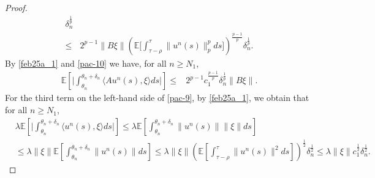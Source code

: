 \documentclass[11pt]{article}
\numberwithin{equation}{section}
\theoremstyle{plain}
\begin{document}
\begin{proof}
\begin{align}
                  \delta_n^{\frac{1}{p} }  \nonumber\\
     \le &2^{p-1} \|B\xi \| 
                  \left( \mathbb{E} 
                                  \bigg[ \int_{\tau - \rho}^{\tau} 
                                                 \|u^n(s)\|_p^p ds 
                                   \bigg] 
                  \right)^{\frac{p-1}{p} } 
                  \delta_n^{\frac{1}{p} }.                                                        
 \end{align}
 By \eqref{feb25a_1} and
 \eqref{pac-10} we have,
 for all $n\ge N_1$,
  \begin{align} \label{pac-12}
        \mathbb{E} 
                  \left[ \Big|
                               \int_{\theta_n}^{\theta_n + \delta_n} 
                                      \langle A u^n(s), \xi \rangle ds 
                            \Big|
                  \right] 
  \le & 2^{p-1} 
          c_1 ^{\frac{p-1}{p} } 
               \delta_n^{\frac{1}{p} }\|B\xi \| .                               
 \end{align}
  For the third term on the left-hand side of \eqref{pac-9}, 
 by \eqref{feb25a_1}, we obtain that for all $n \ge N_1$, 
 \begin{align} \label{pac-13}
      & \lambda 
             \mathbb{E} 
                    \left[ 
                             \Big| \int_{\theta_n}^{\theta_n + \delta_n} 
                                          \langle u^n(s), \xi \rangle ds
                             \Big|
                    \right]  
  \le   \lambda 
                \mathbb{E} 
                       \left[ \int_{\theta_n}^{\theta_n + \delta_n} 
                                         \| u^n(s) \|  \| \xi \| ds
                       \right]     \nonumber\\
 & \le   \lambda \| \xi \|
                \mathbb{E} 
                       \left[ \int_{\theta_n}^{\theta_n + \delta_n} 
                                         \| u^n(s) \| ds
                       \right]  
  \le   \lambda \| \xi \|
                \left( \mathbb{E} 
                                \left[ \int_{\tau - \rho}^\tau
                                                  \| u^n(s) \|^2 ds
                                \right]
                \right)^{\frac{1}{2} }
                    \delta_n^{\frac{1}{2} }  
  \le   \lambda \| \xi \| c_1^{\frac{1}{2} }
                    \delta_n^{\frac{1}{2} }.                                                                                 
 \end{align} 

\end{proof}
\end{document}
